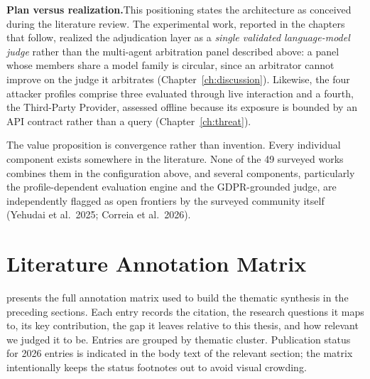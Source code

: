 \documentclass[11pt,a4paper]{report}
\begin{document}
\begin{notebox}
\textbf{Plan versus realization.}\quad This positioning states the architecture as conceived during the literature review. The experimental work, reported in the chapters that follow, realized the adjudication layer as a \emph{single validated language-model judge} rather than the multi-agent arbitration panel described above: a panel whose members share a model family is circular, since an arbitrator cannot improve on the judge it arbitrates (Chapter~\ref{ch:discussion}). Likewise, the four attacker profiles comprise three evaluated through live interaction and a fourth, the Third-Party Provider, assessed offline because its exposure is bounded by an API contract rather than a query (Chapter~\ref{ch:threat}).
\end{notebox}

\enlargethispage{2\baselineskip}%
The value proposition is convergence rather than invention. Every individual component exists somewhere in the literature. None of the 49 surveyed works combines them in the configuration above, and several components, particularly the profile-dependent evaluation engine and the GDPR-grounded judge, are independently flagged as open frontiers by the surveyed community itself (Yehudai et al.\ 2025; Correia et al.\ 2026).



\newpage
\section{Literature Annotation Matrix}
\label{app:annotation}

 presents the full annotation matrix used to build the thematic synthesis in the preceding sections. Each entry records the citation, the research questions it maps to, its key contribution, the gap it leaves relative to this thesis, and how relevant we judged it to be. Entries are grouped by thematic cluster. Publication status for 2026 entries is indicated in the body text of the relevant section; the matrix intentionally keeps the status footnotes out to avoid visual crowding.
\end{document}
